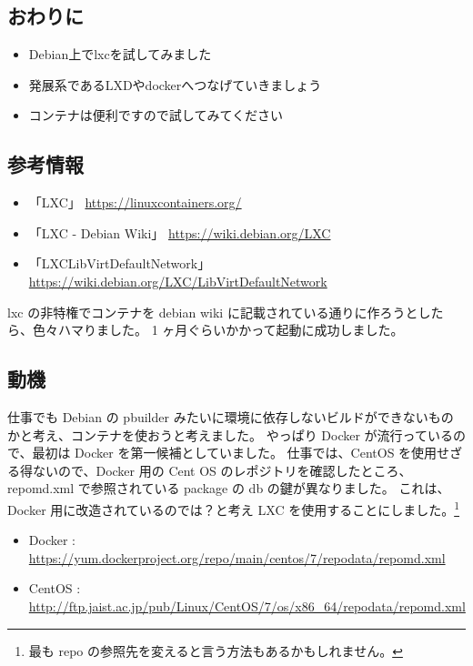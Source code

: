 \documentclass[mingoth,a4paper]{jsarticle}
\begin{document}
\subsection[containsverbatim]{おわりに}
  \begin{itemize}
  \item Debian上でlxcを試してみました
  \item 発展系であるLXDやdockerへつなげていきましょう
  \item コンテナは便利ですので試してみてください
  \end{itemize}



\subsection{参考情報}
  \begin{itemize}
  \item 「LXC」 \url{https://linuxcontainers.org/}
  \item 「LXC - Debian Wiki」 \url{https://wiki.debian.org/LXC}
  \item 「LXCLibVirtDefaultNetwork」 \url{https://wiki.debian.org/LXC/LibVirtDefaultNetwork}
  \end{itemize}


lxc の非特権でコンテナを debian wiki に記載されている通りに作ろうとしたら、色々ハマりました。
1 ヶ月ぐらいかかって起動に成功しました。

\subsection{動機}
仕事でも Debian の pbuilder みたいに環境に依存しないビルドができないものかと考え、コンテナを使おうと考えました。 
やっぱり Docker が流行っているので、最初は Docker を第一候補としていました。
仕事では、CentOS を使用せざる得ないので、Docker 用の Cent OS のレポジトリを確認したところ、
repomd.xml で参照されている package の db の鍵が異なりました。 これは、Docker 用に改造されているのでは？と考え LXC を使用することにしました。\footnote{最も repo の参照先を変えると言う方法もあるかもしれません。}


\begin{itemize}
	\item Docker : \url{https://yum.dockerproject.org/repo/main/centos/7/repodata/repomd.xml} 
	\item CentOS : \url{http://ftp.jaist.ac.jp/pub/Linux/CentOS/7/os/x86_64/repodata/repomd.xml}
\end{itemize}
\end{document}
